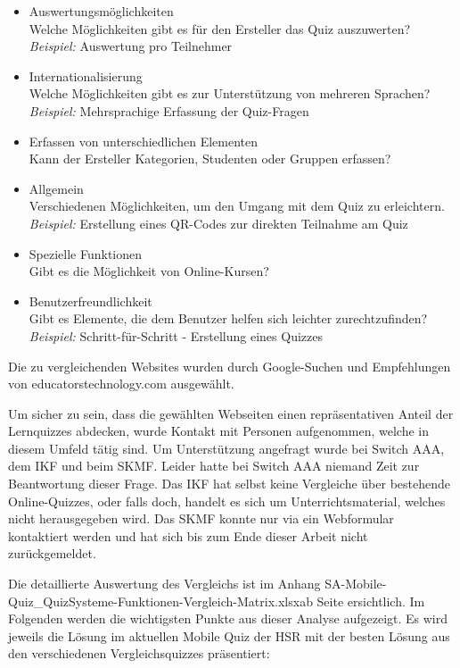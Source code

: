 \begin{itemize}
		\item Auswertungsmöglichkeiten \\
		Welche Möglichkeiten gibt es für den Ersteller das Quiz auszuwerten? \\
		\textit{Beispiel:} Auswertung pro Teilnehmer
		\item Internationalisierung \\
		Welche Möglichkeiten gibt es zur Unterstützung von mehreren Sprachen? \\
		\textit{Beispiel:} Mehrsprachige Erfassung der Quiz-Fragen
		\item Erfassen von unterschiedlichen Elementen \\
		Kann der Ersteller Kategorien, Studenten oder Gruppen erfassen?
		\item Allgemein \\
		Verschiedenen Möglichkeiten, um den Umgang mit dem Quiz zu erleichtern. \\
		\textit{Beispiel:} Erstellung eines QR-Codes zur direkten Teilnahme am Quiz
		\item Spezielle Funktionen \\
		Gibt es die Möglichkeit von Online-Kursen?
		\item Benutzerfreundlichkeit \\
		Gibt es Elemente, die dem Benutzer helfen sich leichter zurechtzufinden? \\
		\textit{Beispiel:} Schritt-für-Schritt - Erstellung eines Quizzes
	\end{itemize}
	
	\bigskip
	
	Die zu vergleichenden Websites wurden durch Google-Suchen und Empfehlungen von educatorstechnology.com \cite{educatorstechnology.com} ausgewählt.
		
	Um sicher zu sein, dass die gewählten Webseiten einen repräsentativen Anteil der Lernquizzes abdecken, wurde Kontakt mit Personen aufgenommen, welche in diesem Umfeld tätig sind. Um Unterstützung angefragt wurde bei Switch AAA, dem \acrfull{IKF} und beim \acrfull{SKMF}.
	Leider hatte bei Switch AAA niemand Zeit zur Beantwortung dieser Frage. Das \acrshort{IKF} hat selbst keine Vergleiche über bestehende Online-Quizzes, oder falls doch, handelt es sich um Unterrichtsmaterial, welches nicht herausgegeben wird. Das \acrshort{SKMF} konnte nur via ein Webformular kontaktiert werden und hat sich bis zum Ende dieser Arbeit nicht zurückgemeldet.
	
	\bigskip
	
	Die detaillierte Auswertung des Vergleichs ist im Anhang \glqq SA-Mobile-Quiz\_QuizSysteme-Funktionen-Vergleich-Matrix.xlsx\grqq ab Seite \hyperlink{page.\getpagerefnumber{pdf:webauswertungMatrix}}{} ersichtlich. Im Folgenden werden die wichtigsten Punkte aus dieser Analyse aufgezeigt. Es wird jeweils die Lösung im aktuellen Mobile Quiz der HSR mit der besten Lösung aus den verschiedenen Vergleichsquizzes präsentiert:
	

